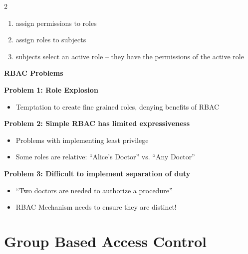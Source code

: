\documentclass[a4paper,9pt]{extarticle}
\begin{document}
\begin{multicols}{2}
\begin{enumerate}[leftmargin=*, itemsep=1pt, topsep=1pt]
\item assign permissions to roles

\item assign roles to subjects

\item subjects select an active role -- they have the permissions of the active role

\end{enumerate}


\begin{warning}

\textbf{RBAC Problems}

\textbf{Problem 1: Role Explosion}

\begin{itemize}

\item Temptation to create fine grained roles, denying benefits of RBAC

\end{itemize}

\textbf{Problem 2: Simple RBAC has limited expressiveness}

\begin{itemize}

\item Problems with implementing least privilege

\item Some roles are relative: ``Alice's Doctor'' vs. ``Any Doctor''

\end{itemize}

\textbf{Problem 3: Difficult to implement separation of duty}

\begin{itemize}

\item ``Two doctors are needed to authorize a procedure''

\item RBAC Mechanism needs to ensure they are distinct!

\end{itemize}

\end{warning}



\section{Group Based Access Control}



\end{multicols}
\end{document}
